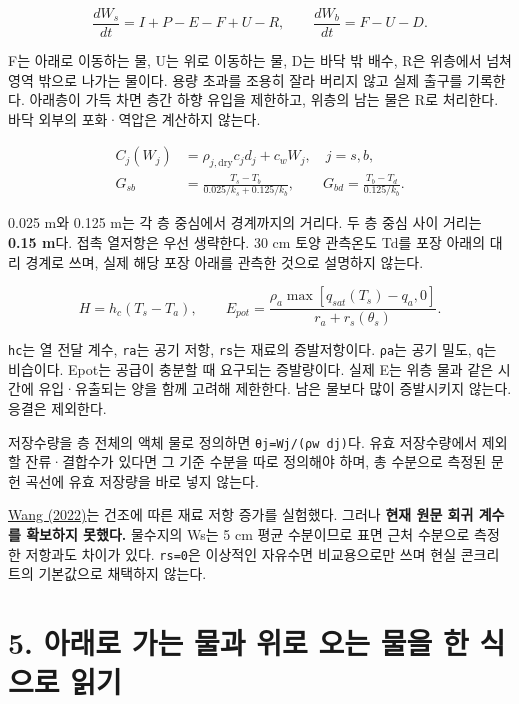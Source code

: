 \documentclass[11pt,a4paper]{article}
\begin{document}
\begin{equation*}
\frac{dW_s}{dt}=I+P-E-F+U-R,\qquad
\frac{dW_b}{dt}=F-U-D.\tag{W1}
\end{equation*}

F는 아래로 이동하는 물, U는 위로 이동하는 물, D는 바닥 밖 배수, R은 위층에서 넘쳐 영역 밖으로 나가는 물이다. 용량 초과를 조용히 잘라 버리지 않고 실제 출구를 기록한다. 아래층이 가득 차면 층간 하향 유입을 제한하고, 위층의 남는 물은 R로 처리한다. 바닥 외부의 포화·역압은 계산하지 않는다.

\begin{equation*}
\begin{aligned}
C_j(W_j)&=\rho_{j,\mathrm{dry}}c_jd_j+c_wW_j,\quad j=s,b,\\
G_{sb}&=\frac{T_s-T_b}{0.025/k_s+0.125/k_b},\qquad
G_{bd}=\frac{T_b-T_d}{0.125/k_b}.
\end{aligned}\tag{T3}
\end{equation*}

0.025 m와 0.125 m는 각 층 중심에서 경계까지의 거리다. 두 층 중심 사이 거리는 \textbf{0.15 m}다. 접촉 열저항은 우선 생략한다. 30 cm 토양 관측온도 Td를 포장 아래의 대리 경계로 쓰며, 실제 해당 포장 아래를 관측한 것으로 설명하지 않는다.

\begin{equation*}
H=h_c(T_s-T_a),\qquad
E_{pot}=\frac{\rho_a\max[q_{sat}(T_s)-q_a,0]}{r_a+r_s(\theta_s)}.\tag{E1}
\end{equation*}

\texttt{hc}는 열 전달 계수, \texttt{ra}는 공기 저항, \texttt{rs}는 재료의 증발저항이다. \texttt{ρa}는 공기 밀도, \texttt{q}는 비습이다. Epot는 공급이 충분할 때 요구되는 증발량이다. 실제 E는 위층 물과 같은 시간에 유입·유출되는 양을 함께 고려해 제한한다. 남은 물보다 많이 증발시키지 않는다. 응결은 제외한다.

저장수량을 층 전체의 액체 물로 정의하면 \texttt{θj=Wj/(ρw dj)}다. 유효 저장수량에서 제외할 잔류·결합수가 있다면 그 기준 수분을 따로 정의해야 하며, 총 수분으로 측정된 문헌 곡선에 유효 저장량을 바로 넣지 않는다.

\href{\detokenize{https://doi.org/10.1016/j.buildenv.2022.109083}}{Wang (2022)}는 건조에 따른 재료 저항 증가를 실험했다. 그러나 \textbf{현재 원문 회귀 계수를 확보하지 못했다.} 물수지의 Ws는 5 cm 평균 수분이므로 표면 근처 수분으로 측정한 저항과도 차이가 있다. \texttt{rs=0}은 이상적인 자유수면 비교용으로만 쓰며 현실 콘크리트의 기본값으로 채택하지 않는다.

\section{5. 아래로 가는 물과 위로 오는 물을 한 식으로 읽기}
\end{document}
